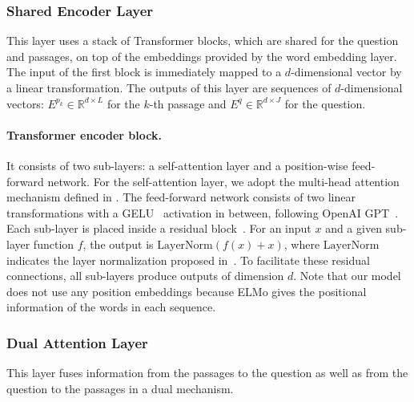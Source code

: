 \documentclass[11pt,a4paper]{article}
\theoremstyle{mydef}
\theoremstyle{myprob}
\begin{document}
\subsubsection{Shared Encoder Layer}
\label{sec:tfenc}


This layer uses a stack of Transformer blocks, which are shared for the question and passages, on top of the embeddings provided by the 
word embedding layer. The input of the first block is immediately 
mapped to a $d$-dimensional vector
by a linear transformation. %
The outputs of this layer are sequences of $d$-dimensional vectors: $E^{p_k} \in \mathbb{R}^{d \times L}$ for the $k$-th passage and $E^q \in \mathbb{R}^{d \times J}$ for the question.

\paragraph{Transformer encoder block.} It consists of two sub-layers: a self-attention layer and a position-wise 
feed-forward network. For the self-attention layer, we adopt the multi-head attention mechanism defined in \citep{VaswaniSPUJGKP17}. The feed-forward network consists of two linear transformations with a GELU~\citep{HendrycksG16} activation in between, following OpenAI GPT~\citep{RadfordNSS18}.
Each sub-layer is placed inside a residual block~\citep{HeZRS16}. For an input $x$ and a given sub-layer function $f$, the output is $\mathrm{LayerNorm}(f(x)+x)$, where $\mathrm{LayerNorm}$ indicates the layer normalization proposed in~\citep{BaKH16}.
To facilitate these residual connections, all sub-layers produce outputs of dimension $d$. Note that our model does not use any position embeddings because  ELMo gives the positional information of the words in each sequence.

\subsubsection{Dual Attention Layer}
\label{sec:dual}

This layer fuses information from the passages to the question as well as from the question to the passages in a dual mechanism. 
\end{document}

